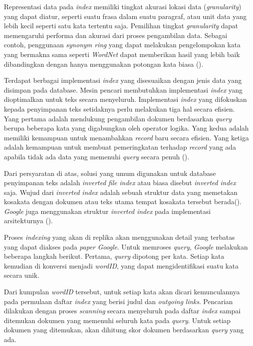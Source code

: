 Representasi data pada \emph{index} memiliki tingkat akurasi lokasi data
(\emph{granularity}) yang dapat diatur, seperti suatu frasa dalam suatu
paragraf, atau unit data yang lebih kecil seperti satu kata tertentu saja.
Pemilihan tingkat \emph{granularity} dapat memengaruhi performa dan akurasi
dari proses pengambilan data. Sebagai contoh, penggunaan \emph{synonym ring}
yang dapat melakukan pengelompokan kata yang bermakna sama seperti
\emph{WordNet} dapat memberikan hasil yang lebih baik dibandingkan dengan hanya
menggunakan potongan kata biasa (\cite{gonzalo1998wordnet}).

Terdapat berbagai implementasi \emph{index} yang disesuaikan dengan jenis data
yang disimpan pada database. Mesin pencari membutuhkan implementasi \emph{index}
yang dioptimalkan untuk teks secara menyeluruh. Implementasi \emph{index} yang
difokuskan kepada penyimpanan teks setidaknya perlu melakukan tiga hal secara
efisien. Yang pertama adalah mendukung pengambilan dokumen berdasarkan
\emph{query} berupa beberapa kata yang digabungkan oleh operator logika.
Yang kedua adalah memiliki kemampuan untuk menambahkan \emph{record} baru
secara efisien. Yang ketiga adalah kemampuan untuk membuat pemeringkatan
terhadap \emph{record} yang ada apabila tidak ada data yang memenuhi
\emph{query} secara penuh (\cite{zobel1992efficient}).

Dari persyaratan di atas, solusi yang umum digunakan untuk database penyimpanan
teks adalah \emph{inverted file index} atau biasa disebut \emph{inverted index}
saja. Wujud dari \emph{inverted index} adalah sebuah struktur data yang 
memetakan kosakata dengan dokumen atau teks utama tempat kosakata tersebut
berada(\cite{hersh2001gigabytes}). \textit{Google} juga menggunakan struktur 
\textit{inverted index} pada implementasi arsitekturnya (\cite{brin1998google}).

Proses \emph{indexing} yang akan di replika akan menggunakan detail yang
terbatas yang dapat diakses pada \emph{paper Google}.  Untuk memroses
\emph{query}, \emph{Google} melakukan beberapa langkah berikut.  Pertama,
\emph{query} dipotong per kata. Setiap kata kemudian di konversi menjadi
\emph{wordID}, yang dapat mengidentifikasi suatu kata secara unik.

Dari kumpulan \emph{wordID} tersebut, untuk setiap kata akan dicari
kemunculannya pada permulaan daftar \emph{index} yang berisi judul dan
\emph{outgoing links}.  Pencarian dilakukan dengan proses \emph{scanning} secara
menyeluruh pada daftar \emph{index} sampai ditemukan dokumen yang memenuhi
seluruh kata pada \emph{query}. Untuk setiap dokumen yang ditemukan, akan
dihitung skor dokumen berdasarkan \emph{query} yang ada.


